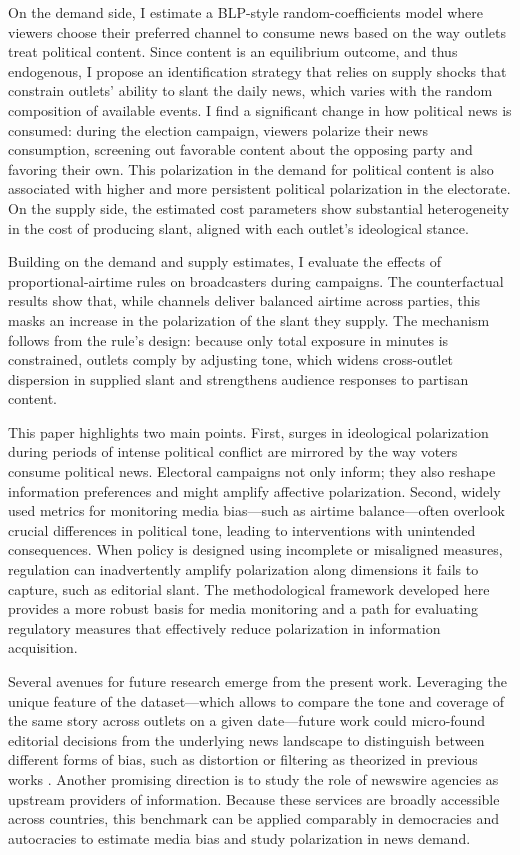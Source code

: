 \documentclass[12pt]{article}
\begin{document}
On the demand side, I estimate a BLP-style random-coefficients model where viewers choose their preferred channel to consume news based on the way outlets treat political content. Since content is an equilibrium outcome, and thus endogenous, I propose an identification strategy that relies on supply shocks that constrain outlets’ ability to slant the daily news, which varies with the random composition of available events. I find a significant change in how political news is consumed: during the election campaign, viewers polarize their news consumption, screening out favorable content about the opposing party and favoring their own. This polarization in the demand for political content is also associated with higher and more persistent political polarization in the electorate. On the supply side, the estimated cost parameters show substantial heterogeneity in the cost of producing slant, aligned with each outlet’s ideological stance.



Building on the demand and supply estimates, I evaluate the effects of  proportional-airtime rules on broadcasters during campaigns. The counterfactual results show that, while channels deliver balanced airtime across parties, this masks an increase in the polarization of the slant they supply. The mechanism follows from the rule’s design: because only total exposure in minutes is constrained, outlets comply by adjusting tone, which widens cross-outlet dispersion in supplied slant and strengthens audience responses to partisan content.

This paper highlights two main points. First, surges in ideological polarization during periods of intense political conflict are mirrored by the way voters consume political news. Electoral campaigns not only inform; they also reshape information preferences and might amplify affective polarization. Second, widely used metrics for monitoring media bias—such as airtime balance—often overlook crucial differences in political tone, leading to interventions with unintended consequences. When policy is designed using incomplete or misaligned measures, regulation can inadvertently amplify polarization along dimensions it fails to capture, such as editorial slant. The methodological framework developed here provides a more robust basis for media monitoring and a path for evaluating regulatory measures that effectively reduce polarization in information acquisition.

Several avenues for future research emerge from the present work. Leveraging the unique feature of the dataset—which allows to compare the tone and coverage of the same story across outlets on a given date—future work could micro-found editorial decisions  from the underlying news landscape to distinguish between different forms of bias, such as distortion or filtering as theorized in previous works \citep[e.g.][]{gentzkow2014media}. Another promising direction is to study the role of newswire agencies as  upstream providers of information.  Because these services are broadly accessible across countries, this benchmark can be applied comparably in democracies and autocracies to estimate media bias and study polarization in news demand.
\end{document}
